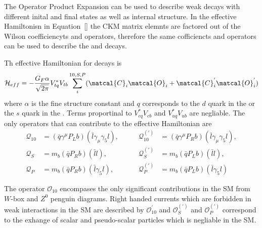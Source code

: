 {{The Operator Product Expansion can be used to describe weak decays with different inital and final states as well as internal structure. In the effective Hamiltonisn in Equation~\ref{} the CKM matrix elemnts are factored out of the Wilson coefficiencyts and operators, therefore the same cofficiencts and operators can be used to describe the \bd and \bs decays.

Th effective Hamiltonian for \bmumu decays is
\begin{equation}
\mathcal{H}_{eff} = -\frac{G_F \alpha}{\sqrt{2\pi}} V_{tq}^{*}V_{tb} \displaystyle\sum_{i}^{10,S,P} (\matcal{C}_i\matcal{O}_i + \matcal{C}^{'}_{i}\matcal{O}_{i}^{'})
\label{eq:eff_hamil_bmumu}
\end{equation}
where $\alpha$ is the fine structure constant and $q$ corresponds to the $d$ quark in the \bd or the $s$ quark in the \bs. Terms proportinal to $V^*_{cq}V_{cb}$ and $V^*_{uq}V_{ub}$ are negliable. The only operators that can contribute to the \bmumu effective Hamiltonian are
\begin{align}
 \mathcal{Q}_{10}&=(\bar{q}\gamma^{\mu}P_{L}b)(\bar{l}\gamma_{\mu}\gamma_{5}l), &\qquad
 \mathcal{Q}_{10}^{(')}&= (\bar{q}\gamma^{\mu}P_{R}b)(\bar{l}\gamma_{\mu}\gamma_{5}l), \\
 \mathcal{Q}_{S}&= m_{b}(\bar{q}P_{R}b)(\bar{l}l),  &\qquad
\mathcal{Q}_{S}^{(')}&= m_{b}(\bar{q}P_{L}b)(\bar{l}l), \\
 \mathcal{Q}_{P}&= m_{b}(\bar{q}P_{R}b)(\bar{l}\gamma_{5}l), &\qquad
 \mathcal{Q}_{P}^{(')}&= m_{b}(\bar{q}P_{L}b)(\bar{l}\gamma_{5}l)
\end{align}


The operator $\mathcal{O}_{10}$ encompases the only significant contributions in the SM from $W$-box and $Z^0$ penguin diagrams. 
Right handed currents which are forbidden in weak interactions in the SM are described by $\mathcal{O}_{10}^'$ and $\mathcal{O}_{S}^{(')}$ and $\mathcal{O}_{P}^{(')}$ correspond to the exhange of scalar and pseudo-scalar particles which is negliable in the SM. 

}}
